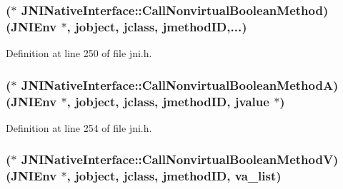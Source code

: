 \hypertarget{struct_j_n_i_native_interface_a67b30893aa6ae36ee73e6a491625e377}{
\subsubsection[{Call\-Nonvirtual\-Boolean\-Method}]{($\ast$ J\-N\-I\-Native\-Interface\-::\-Call\-Nonvirtual\-Boolean\-Method)({\bf J\-N\-I\-Env} $\ast$, {\bf jobject}, {\bf jclass}, {\bf jmethod\-I\-D},...)}}\label{struct_j_n_i_native_interface_a67b30893aa6ae36ee73e6a491625e377}


Definition at line 250 of file jni.\-h.

\hypertarget{struct_j_n_i_native_interface_afdbb73f9486592a75bb2b71441770ab2}{
\subsubsection[{Call\-Nonvirtual\-Boolean\-Method\-A}]{($\ast$ J\-N\-I\-Native\-Interface\-::\-Call\-Nonvirtual\-Boolean\-Method\-A)({\bf J\-N\-I\-Env} $\ast$, {\bf jobject}, {\bf jclass}, {\bf jmethod\-I\-D}, {\bf jvalue} $\ast$)}}\label{struct_j_n_i_native_interface_afdbb73f9486592a75bb2b71441770ab2}


Definition at line 254 of file jni.\-h.

\hypertarget{struct_j_n_i_native_interface_ab8a0dc5bc29ecc39f9dcc9f020858cdd}{
\subsubsection[{Call\-Nonvirtual\-Boolean\-Method\-V}]{($\ast$ J\-N\-I\-Native\-Interface\-::\-Call\-Nonvirtual\-Boolean\-Method\-V)({\bf J\-N\-I\-Env} $\ast$, {\bf jobject}, {\bf jclass}, {\bf jmethod\-I\-D}, va\-\_\-list)}}\label{struct_j_n_i_native_interface_ab8a0dc5bc29ecc39f9dcc9f020858cdd}


